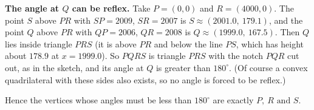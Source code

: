 \textbf{The angle at $Q$ can be reflex.} Take $P=(0,0)$ and $R=(4000,0)$. The point $S$ above $PR$ with $SP=2009$, $SR=2007$ is $S\approx(2001.0,\ 179.1)$, and the point $Q$ above $PR$ with $QP=2006$, $QR=2008$ is $Q\approx(1999.0,\ 167.5)$. Then $Q$ lies inside triangle $PRS$ (it is above $PR$ and below the line $PS$, which has height about $178.9$ at $x=1999.0$). So $PQRS$ is triangle $PRS$ with the notch $PQR$ cut out, as in the sketch, and its angle at $Q$ is greater than $180^\circ$. (Of course a convex quadrilateral with these sides also exists, so no angle is forced to be reflex.)

Hence the vertices whose angles must be less than $180^\circ$ are exactly $\boxed{P,\ R\text{ and }S}$.
